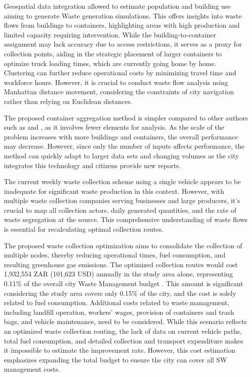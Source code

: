 \documentclass[authoryear,preprint,review,11pt,doubleblind]{elsarticle}
\begin{document}
Geospatial data integration allowed to estimate population and building use aiming to generate Waste generation simulations. This offers insights into waste flows from buildings to containers, highlighting areas with high production and limited capacity requiring intervention. While the building-to-container assignment may lack accuracy due to access restrictions, it serves as a proxy for collection points, aiding in the strategic placement of larger containers to optimize truck loading times, which are currently going home by home. Clustering can further reduce operational costs by minimizing travel time and workforce hours. However, it is crucial to conduct waste flow analysis using Manhattan distance movement, considering the constraints of city navigation rather than relying on Euclidean distances.

    The proposed container aggregation method is simpler compared to other authors such as \citet{al-refaieOptimizationModelsClustering2020} and \citet{viktorinHierarchicalClusteringbasedAlgorithms2023}, as it involves fewer elements for analysis. As the scale of the problem increases with more buildings and containers, the overall performance may decrease. However, since only the number of inputs affects performance, the method can quickly adapt to larger data sets and changing volumes as the city integrates this technology and citizens provide new reports.

    The current weekly waste collection scheme using a single vehicle appears to be inadequate for significant waste production in this context. However, with multiple waste collection companies serving businesses and large producers, it's crucial to map all collection actors, daily generated quantities, and the rate of waste segregation at the source. This comprehensive understanding of waste flows is essential for recalculating optimal collection routes.

    The proposed waste collection optimization aims to consolidate the collection of multiple nodes, thereby reducing operational times, fuel consumption, and resulting greenhouse gas emissions. The optimized collection routes would cost 1,932,554 ZAR (101,623 USD) annually in the study area alone, representing 0.11\% of the overall city Waste Management budget \citep{tshwane20232024MediumtermRevenue2023}. This amount is significant considering the study area covers only 0.15\% of the city, and the cost is solely related to fuel consumption. 
    Additional costs related to waste management, including landfill operation, workers' wages, provision of containers and trash bags, and vehicle maintenance, need to be considered. While this scenario reflects an optimized waste collection routing, the lack of data on current vehicle paths, total fuel consumption, and detailed collection and transport expenditure makes it impossible to estimate the improvement rate. However, this cost estimation emphasizes expanding the total budget to ensure the city can cover all SW management costs.
    
\end{document}
